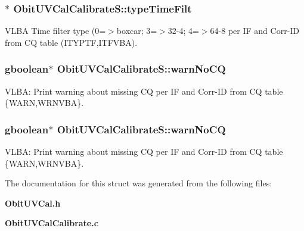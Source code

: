 \subsubsection{$\ast$ {\bf Obit\-UVCal\-Calibrate\-S::type\-Time\-Filt}}\label{structObitUVCalCalibrateS_o50}


VLBA Time filter type (0=$>$boxcar; 3=$>$32-4; 4=$>$64-8 per IF and Corr-ID from CQ table (ITYPTF,ITFVBA). 

\subsubsection{\setlength{\rightskip}{0pt plus 5cm}gboolean$\ast$ {\bf Obit\-UVCal\-Calibrate\-S::warn\-No\-CQ}}\label{structObitUVCalCalibrateS_o81}


VLBA: Print warning about missing CQ per IF and Corr-ID from CQ table \{WARN,WRNVBA\}. 

\subsubsection{\setlength{\rightskip}{0pt plus 5cm}gboolean$\ast$ {\bf Obit\-UVCal\-Calibrate\-S::warn\-No\-CQ}}\label{structObitUVCalCalibrateS_o54}


VLBA: Print warning about missing CQ per IF and Corr-ID from CQ table \{WARN,WRNVBA\}. 



The documentation for this struct was generated from the following files:\begin{CompactItemize}
\item 
{\bf Obit\-UVCal.h}\item 
{\bf Obit\-UVCal\-Calibrate.c}\end{CompactItemize}
